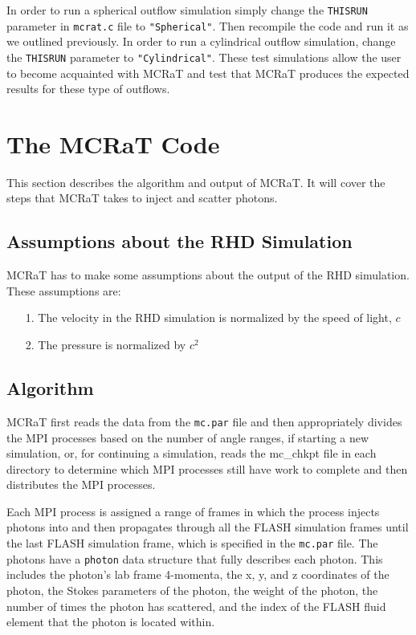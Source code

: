 \documentclass[12pt,a4paper]{article}
\begin{document}
 In order to run a spherical outflow simulation simply change the \texttt{THISRUN} parameter in \texttt{mcrat.c} file to \texttt{"Spherical"}. Then recompile the code and run it as we outlined previously. In order to run a cylindrical outflow simulation, change the \texttt{THISRUN} parameter to \texttt{"Cylindrical"}. These test simulations allow the user to become acquainted with MCRaT and test that MCRaT produces the expected results for these type of outflows.
 

\section{The MCRaT Code}
This section describes the algorithm and output of MCRaT. It will cover the steps that MCRaT takes to inject and scatter photons.

\subsection{Assumptions about the RHD Simulation}
MCRaT has to make some assumptions about the output of the RHD simulation. These assumptions are:
\begin{itemize}
\item[1.] The velocity in the RHD simulation is normalized by the speed of light, $c$ 
\item[2.] The pressure is normalized by $c^2$
\end{itemize}

\subsection{Algorithm}

MCRaT first reads the data from the \texttt{mc.par} file and then appropriately divides the MPI processes based on the number of angle ranges, if starting a new simulation, or, for continuing a simulation, reads the mc\_chkpt file in each directory to determine which MPI processes still have work to complete and then distributes the MPI processes. 

Each MPI process is assigned a range of frames in which the process injects photons into and then propagates through all the FLASH simulation frames until the last FLASH simulation frame, which is specified in the \texttt{mc.par} file. The photons have a \texttt{photon} data structure that fully describes each photon. This includes the photon's lab frame 4-momenta, the x, y, and z coordinates of the photon, the Stokes parameters of the photon, the weight of the photon, the number of times the photon has scattered, and the index of the FLASH fluid element that the photon is located within.
\end{document}
